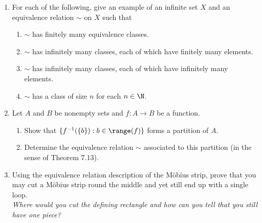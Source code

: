 \begin{enumerate}
	\item For each of the following, give an example of an infinite set $X$ and an equivalence relation $\sim$ on $X$ such that
\begin{enumerate}
    \item $\sim$ has finitely many equivalence classes.
    \item $\sim$ has infinitely many classes, each of which have finitely many elements.
    \item $\sim$ has infinitely many classes, each of which have infinitely many elements.
    \item $\sim$ has a class of size $n$ for each $n \in \N$.
\end{enumerate}

\item Let $A$ and $B$ be nonempty sets and $f : A \to B$ be a function. 
\begin{enumerate}
    \item Show that $\{f^{-1}(\{b\}) : b \in \range(f)\}$ forms a partition of $A$.
    \item Determine the equivalence relation $\sim$ associated to this partition (in the sense of Theorem 7.13).
\end{enumerate}
  
	\item Using the equivalence relation description of the Möbius strip, prove that you may cut a Möbius strip round the middle and yet still end up with a single loop.\\
	\emph{Where would you cut the defining rectangle and how can you tell that you still have one piece?}


\end{enumerate}
